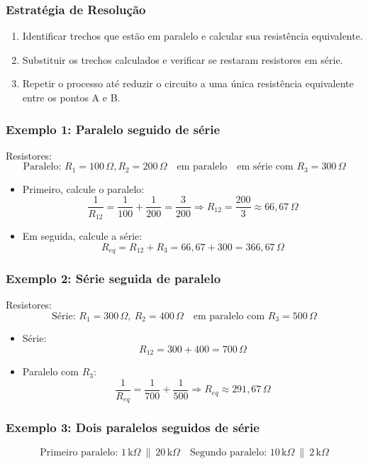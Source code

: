 \subsubsection{Estratégia de Resolução}
\begin{enumerate}
    \item Identificar trechos que estão em paralelo e calcular sua resistência equivalente.
    \item Substituir os trechos calculados e verificar se restaram resistores em série.
    \item Repetir o processo até reduzir o circuito a uma única resistência equivalente entre os pontos A e B.
\end{enumerate}

\subsubsection{Exemplo 1: Paralelo seguido de série}
Resistores:
\[
\text{Paralelo: } R_1 = 100\,\Omega, R_2 = 200\,\Omega \quad\text{em paralelo}
\quad\text{em série com } R_3 = 300\,\Omega
\]

\begin{itemize}
    \item Primeiro, calcule o paralelo:
    \[
    \frac{1}{R_{12}} = \frac{1}{100} + \frac{1}{200} = \frac{3}{200} \Rightarrow R_{12} = \frac{200}{3} \approx 66{,}67\,\Omega
    \]
    \item Em seguida, calcule a série:
    \[
    R_{eq} = R_{12} + R_3 = 66{,}67 + 300 = 366{,}67\,\Omega
    \]
\end{itemize}

\subsubsection{Exemplo 2: Série seguida de paralelo}
Resistores:
\[
\text{Série: } R_1 = 300\,\Omega,\ R_2 = 400\,\Omega
\quad\text{em paralelo com } R_3 = 500\,\Omega
\]

\begin{itemize}
    \item Série:
    \[
    R_{12} = 300 + 400 = 700\,\Omega
    \]
    \item Paralelo com $R_3$:
    \[
    \frac{1}{R_{eq}} = \frac{1}{700} + \frac{1}{500} \Rightarrow R_{eq} \approx 291{,}67\,\Omega
    \]
\end{itemize}

\subsubsection{Exemplo 3: Dois paralelos seguidos de série}
\[
\text{Primeiro paralelo: } 1\,\text{k}\Omega\ \| \ 20\,\text{k}\Omega
\quad\text{Segundo paralelo: } 10\,\text{k}\Omega\ \| \ 2\,\text{k}\Omega
\]

